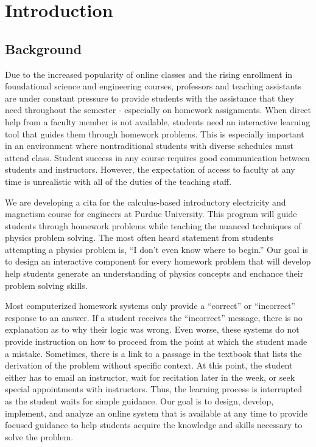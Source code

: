 \chapter[Introduction]{Introduction}

\section{Background}

Due to the increased popularity of online classes and the rising enrollment in foundational science and engineering courses, professors and teaching assistants are under constant pressure to provide students with the assistance that they need throughout the semester - especially on homework assignments. When direct help from a faculty member is not available, students need an interactive learning tool that guides them through homework problems. This is especially important in an environment where nontraditional students with diverse schedules must attend class\cite{choy2002, horn1996}. Student success in any course requires good communication between students and instructors. However, the expectation of access to faculty at any time is unrealistic with all of the duties of the teaching staff.

We are developing a \gls{cita} for the calculus-based introductory electricity and magnetism course for engineers at Purdue University. This program will guide students through homework problems while teaching the nuanced techniques of physics problem solving. The most often heard statement from students attempting a physics problem is, ``I don’t even know where to begin.'' Our goal is to design an interactive component for every homework problem that will develop help students generate an understanding of physics concepts and enchance their problem solving skills.

Most computerized homework systems only provide a ``correct'' or ``incorrect'' response to an answer. If a student receives the ``incorrect'' message, there is no explanation as to why their logic was wrong. Even worse, these systems do not provide instruction on how to proceed from the point at which the student made a mistake. Sometimes, there is a link to a passage in the textbook that lists the derivation of the problem without specific context. At this point, the student either has to email an instructor, wait for recitation later in the week, or seek special appointments with instructors. Thus, the learning process is interrupted as the student waits for simple guidance. Our goal is to design, develop, implement, and analyze an online system that is available at any time to provide focused guidance to help students acquire the knowledge and skills necessary to solve the problem.

